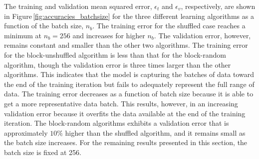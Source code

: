 \documentclass[review]{elsarticle}
\begin{document}
The training and validation mean squared error, $\epsilon_t$ and
$\epsilon_v$, respectively, are shown in
Figure\,\ref{fig:accuracies_batchsize} for the three different
learning algorithms as a function of the batch size, $n_b$. The
training error for the shuffled case reaches a minimum at $n_b=256$
and increases for higher $n_b$. The validation error, however, remains
constant and smaller than the other two algorithms. The training error
for the block-unshuffled algorithm is less than that for the block-random
algorithm, though the validation error is three times larger than the
other algorithms. This indicates that the model is capturing the
batches of data toward the end of the training iteration but fails to
adequately represent the full range of data. The training error
decreases as a function of batch size because it is able to get a more
representative data batch. This results, however, in an increasing
validation error because it overfits the data available at the end of the
training iteration. The block-random algorithms exhibits a validation
error that is approximately $10\%$ higher than the shuffled algorithm,
and it remains small as the batch size increases. For the remaining
results presented in this section, the batch size is fixed at 256.
\end{document}
